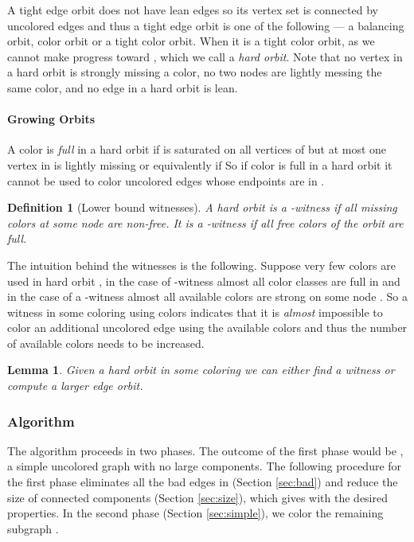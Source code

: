 \documentclass[titlepage, 11pt]{article}
\newtheorem{definition}{Definition}
\newtheorem{lemma}[theorem]{Lemma}
\begin{document}
A tight edge orbit does not have lean edges so its vertex set is connected 
by uncolored edges and thus a tight edge orbit is one of the following 
--- a balancing orbit, color orbit or a tight color orbit. 
When it is a tight color orbit, as we cannot make progress toward , 
which we call a \emph{hard orbit}. 
Note that no vertex in a hard orbit is strongly missing a color, no two
nodes are lightly messing the same color, and no edge in a hard orbit is lean.

\paragraph{Growing Orbits}
A color  is \emph{full} in a hard orbit  if  is saturated on all vertices of  but at most one vertex in  is lightly missing  or equivalently if 
So if color  is full in a hard orbit  it cannot be used to color uncolored edges whose endpoints are in .
\begin{definition}[Lower bound witnesses]
A hard orbit is a -witness if all missing colors at some node are non-free. It is a -witness if all free colors of the orbit are full.
\end{definition}
The intuition behind the witnesses is the following. Suppose very few colors are used in hard orbit , in the case of -witness almost all color classes are full in  and in the case of a -witness almost all available colors are strong on some node . So a witness in some coloring using  colors indicates that it is \textit{almost} impossible to color an additional uncolored edge using the available  colors and thus the number of available colors needs to be increased.  
\begin{lemma}\label{lemma:groworbit}
\cite{sanders05} Given a hard orbit in some coloring we can either find a witness or compute a larger edge orbit.
\end{lemma} 

\subsubsection{Algorithm}\label{sec:alg}
The algorithm proceeds in two phases. The outcome of the first phase would be , a simple uncolored graph with no large components. 
The following procedure for the first phase 
eliminates all the bad edges in  (Section \ref{sec:bad}) and reduce the size of connected components 
(Section \ref{sec:size}), which gives  with the desired properties.
In the second phase (Section \ref{sec:simple}), we color the remaining subgraph .
\end{document}
